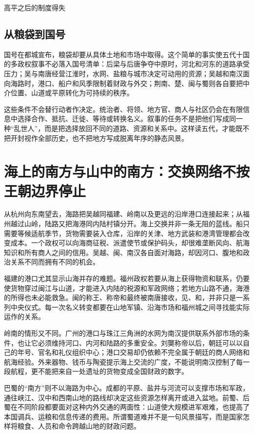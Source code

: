 \begin{causalchain}{高平之后的制度得失}
\subsection{从粮袋到国号}

国号在都城宣布，粮袋却要从具体土地和市场中取得。这个简单的事实使五代十国的多政权叙事不必落入国号清单：后梁与后唐争夺中原时，河北和河东的道路承受压力；吴与南唐经营江淮时，水网、盐粮与城市决定可动用的资源；吴越和南汉面向海路时，港口、船户和风季限制着财政与外交；荆南、楚、闽与蜀则各自要把中介位置、山道或平原转化为可持续的秩序。

这些条件不会替行动者作决定。统治者、将领、地方官、商人与社区仍会在有限信息中选择合作、抵抗、迁徙、等待或转换名义。叙事的任务不是把他们写成同一种“乱世人”，而是把选择放回不同的道路、资源和关系中。这样读五代，才能既不把开封视作全部历史，也不把地方写成脱离年序的静态风景。

\section{海上的南方与山中的南方：交换网络不按王朝边界停止}

从杭州向东南望去，海路把吴越同福建、岭南以及更远的沿岸港口连接起来；从福州越过山岭，陆路又把海港同内陆村镇分开。海上交换并非一条无阻的蓝线。船只需要等候适航季节，货物需要装入仓库，沿岸的关津、地方武装和港湾管理都会改变成本。一个政权可以向海商征税、派遣使节或保护码头，却很难垄断风向、航海知识和所有商人之间的信用。吴越、闽、南汉各自面对海路，却因河口、腹地和政治关系不同而拥有不同的机会。

福建的港口尤其显示山海并存的难题。福州政权若要从海上获得物资和联系，仍要使货物穿过闽江与山道，才能进入内陆的税源和军政网络；若地方山路不通，海港的所得也未必能救急。闽的称王、称帝和最终被南唐接收，见、和，并非只是一系列中央仪式。每一次名义转变都要在山地军镇、沿海市场和福州城之间寻找能实际运作的关系。

岭南的情形又不同。广州的港口与珠江三角洲的水网为南汉提供联系外部市场的条件，也让它必须维持河口、内河和陆路的多重安全。刘龑称帝以后，朝廷可以以自己的年号、官名和礼仪组织中心；港口交易却仍依赖不完全属于朝廷的商人网络和航海经验。外来器物、钱币与陶瓷提示海上交流的广度，不能说明南汉控制了每一段航程，更不能把来自一处遗址的货物变成全国财政的数字。

巴蜀的“南方”则不以海路为中心。成都的平原、盐井与河流可以支撑市场和军政，通往峡江、汉中和西南山地的路线却决定这些资源怎样离开或进入盆地。前蜀、后蜀在不同阶段都要面对这种内外交通的两面性：山道使大规模进军艰难，也提高了本国调兵、运粮和信息传递的费用。所谓蜀道难并不是一句风景描写，而是国家怎样将粮食、人员和命令跨越山地的财政问题。


\end{causalchain}
